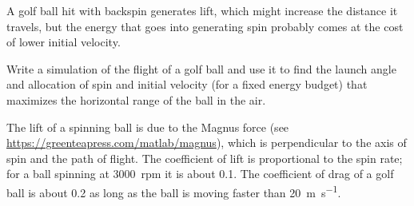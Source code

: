 \documentclass[../../book.tex]{subfiles}
\begin{document}
\begin{ex}
\label{golf}


A golf ball hit with backspin generates lift, which might increase the distance it travels, but the energy that goes into generating spin probably comes at the cost of lower initial velocity.

Write a simulation of the flight of a golf ball and use it to find
the launch angle and allocation of spin and initial velocity
(for a fixed energy budget) that maximizes the horizontal range of the
ball in the air.

The lift of a spinning ball is due to the Magnus force (see
\url{https://greenteapress.com/matlab/magnus}), which is
perpendicular to the axis of spin and the path of flight.  The
coefficient of lift is proportional to the spin rate; for a ball
spinning at 3000~rpm it is about 0.1.  The coefficient of drag of a
golf ball is about 0.2 as long as the ball is moving faster than \SI{20}{\meter\per\second}.

\end{ex}
\end{document}
